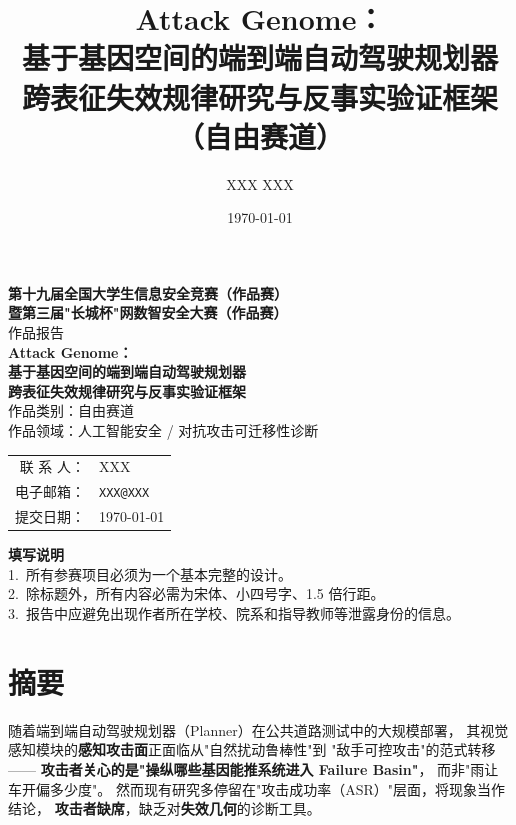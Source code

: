 \documentclass[a4paper,12pt,fontset=fandol]{ctexart}
\title{\bfseries\Large
Attack Genome：\\
基于基因空间的端到端自动驾驶规划器\\
跨表征失效规律研究与反事实验证框架\\[4pt]
\normalsize（自由赛道）}
\author{XXX \quad XXX}
\date{\today}
\begin{document}
\begin{titlepage}
\thispagestyle{empty}
\begin{center}
\vspace*{1cm}

{\Large\bfseries 第十九届全国大学生信息安全竞赛（作品赛）\\
暨第三届"长城杯"网数智安全大赛（作品赛）}\\[12pt]
{\large 作品报告}\\[36pt]

{\LARGE\bfseries Attack Genome：\\[6pt]
基于基因空间的端到端自动驾驶规划器\\
跨表征失效规律研究与反事实验证框架}\\[24pt]

{\large 作品类别：自由赛道}\\[6pt]
{\large 作品领域：人工智能安全 / 对抗攻击可迁移性诊断}\\[48pt]

\begin{tabular}{rl}
{\large 联 系 人：} & {\large XXX}\\
{\large 电子邮箱：} & {\large \texttt{XXX@XXX}}\\
{\large 提交日期：} & {\large \today}\\
\end{tabular}

\vfill
\textbf{填写说明}\\[4pt]
\footnotesize
1.\ 所有参赛项目必须为一个基本完整的设计。\\
2.\ 除标题外，所有内容必需为宋体、小四号字、1.5 倍行距。\\
3.\ 报告中应避免出现作者所在学校、院系和指导教师等泄露身份的信息。
\end{center}
\end{titlepage}

\tableofcontents
\newpage

\section*{摘要}

随着端到端自动驾驶规划器（Planner）在公共道路测试中的大规模部署，
其视觉感知模块的\textbf{感知攻击面}正面临从"自然扰动鲁棒性"到
"敌手可控攻击"的范式转移——
\textbf{攻击者关心的是"操纵哪些基因能推系统进入 Failure Basin"}，
而非"雨让车开偏多少度"。
然而现有研究多停留在"攻击成功率（ASR）"层面，将现象当作结论，
\textbf{攻击者缺席}，缺乏对\textbf{失效几何}的诊断工具。
\end{document}
